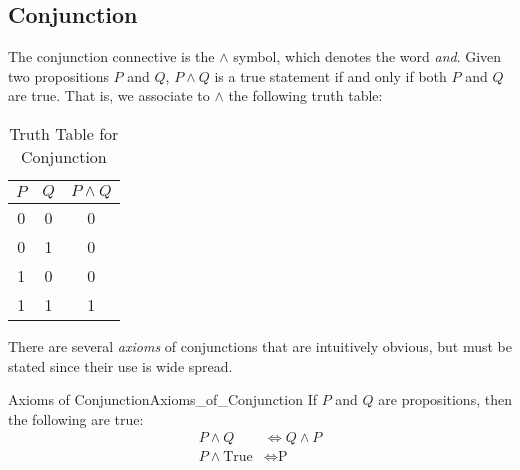     \subsection{Conjunction}
        The conjunction connective is the $\land$ symbol, which denotes the word
        \textit{and}. Given two propositions $P$ and $Q$, $P\land{Q}$ is a true
        statement if and only if both $P$ and $Q$ are true. That is, we
        associate to $\land$ the following truth table:
        \begin{table}[H]
            \centering
            \captionsetup{type=table}
            \begin{tabular}{ccc}
                $P$&$Q$&$P\land{Q}$\\
                \hline
                0&0&0\\
                0&1&0\\
                1&0&0\\
                1&1&1
            \end{tabular}
            \caption{Truth Table for Conjunction}
            \label{tab:Truth_Table_for_Conjunction}
        \end{table}
        There are several \textit{axioms} of conjunctions that are intuitively
        obvious, but must be stated since their use is wide spread.
        \begin{faxiom}{Axioms of Conjunction}{Axioms_of_Conjunction}
            If $P$ and $Q$ are propositions, then the following are true:
            \begin{align}
                P\land{Q}&\Longleftrightarrow{Q}\land{P}
                \tag{Commutativity of Conjunction}\\
                P\land\textrm{True}&\Longleftrightarrow\textrm{P}
                \tag{Identity of Conjunction}
            \end{align}
        \end{faxiom}
